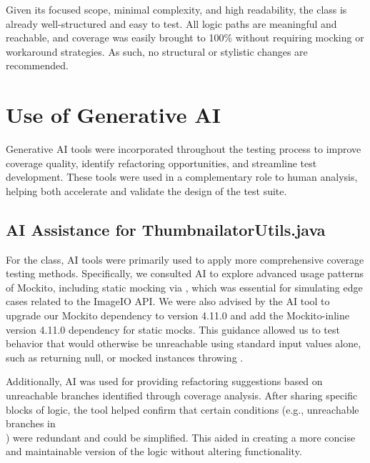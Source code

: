\documentclass[12pt]{article}
\begin{document}
    Given its focused scope, minimal complexity, and high readability, the class
        is already well-structured and easy to test.
    All logic paths are meaningful and reachable, and coverage was easily
        brought to 100\% without requiring mocking or workaround
        strategies.
    As such, no structural or stylistic changes are recommended.

    \section{Use of Generative AI}
    \markboth{}{}

    Generative AI tools were incorporated throughout the testing process to
        improve coverage quality, identify refactoring opportunities, and
        streamline test development.
    These tools were used in a complementary role to human analysis, helping
        both accelerate and validate the design of the test suite.

    \markboth{}{}
    \subsection{AI Assistance for ThumbnailatorUtils.java}
    \markboth{}{}

    For the  class, AI tools were primarily used
        to apply more comprehensive coverage testing methods.
    Specifically, we consulted AI to explore advanced usage patterns of Mockito,
        including static mocking via , which was essential
        for simulating edge cases related to the ImageIO API.
    We were also advised by the AI tool to upgrade our Mockito dependency to
        version 4.11.0 and add the Mockito-inline version 4.11.0 dependency for
        static mocks.
    This guidance allowed us to test behavior that would otherwise be
        unreachable using standard input values alone, such as
         returning null, or mocked
         instances throwing
        .

    Additionally, AI was used for providing refactoring suggestions based on
        unreachable branches identified through coverage analysis.
    After sharing specific blocks of logic, the tool helped confirm that certain
        conditions (e.g., unreachable branches in\\
        ) were redundant and could be
        simplified.
    This aided in creating a more concise and maintainable version of the logic
        without altering functionality.
\end{document}
